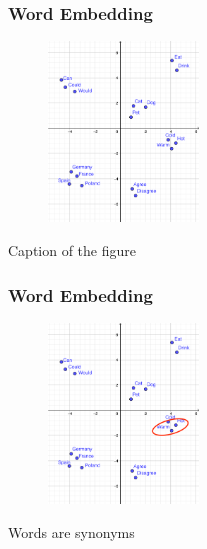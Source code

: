 

\begin{frame}
	\frametitle{Word Embedding}

	\begin{figure}
		\includegraphics[width=4cm]{./figures/Groups}

	\end{figure}
		\begin{center}
		{Caption of the figure}
		\end{center}
	\vspace{-0.5cm}

\end{frame}



\begin{frame}
	\frametitle{Word Embedding}

	\begin{figure}
		\includegraphics[width=4cm]{./figures/Group_synonym}

	\end{figure}
		\begin{center}
		{Words are synonyms}
		\end{center}
	\vspace{-0.5cm}

\end{frame}

